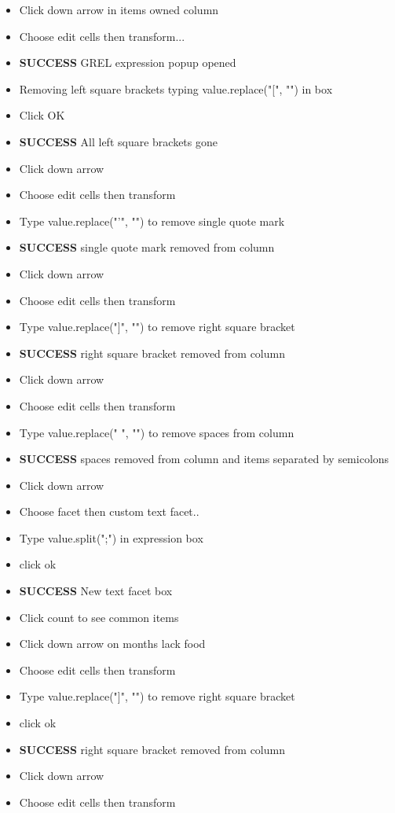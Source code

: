 \documentclass{article}
\begin{document}
\begin{itemize}
\item Click down arrow in items owned column
\item Choose edit cells then transform...
\item \textbf{SUCCESS} GREL expression popup opened
\item Removing left square brackets typing value.replace("[", "") in box
\item Click OK
\item \textbf{SUCCESS} All left square brackets gone
\item Click down arrow 
\item Choose edit cells then transform
\item Type value.replace("'", "") to remove single quote mark
\item \textbf{SUCCESS} single quote mark removed from column
\item Click down arrow 
\item Choose edit cells then transform
\item Type value.replace("]", "") to remove right square bracket
\item \textbf{SUCCESS} right square bracket removed from column
\item Click down arrow 
\item Choose edit cells then transform
\item Type value.replace(" ", "") to remove spaces from column
\item \textbf{SUCCESS} spaces removed from column and items separated by semicolons
\item Click down arrow
\item Choose facet then custom text facet..
\item Type value.split(";") in expression box
\item click ok
\item \textbf{SUCCESS} New text facet box 
\item Click count to see common items
\item Click down arrow on months lack food
\item Choose edit cells then transform
\item Type value.replace("]", "") to remove right square bracket
\item click ok
\item \textbf{SUCCESS} right square bracket removed from column
\item Click down arrow 
\item Choose edit cells then transform

\end{itemize}
\end{document}
